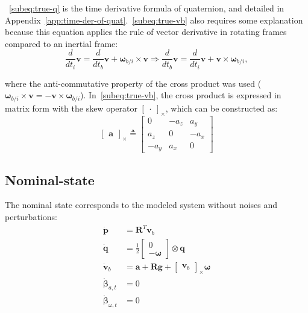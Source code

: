 ~\eqref{subeq:true-q} is the time derivative formula of quaternion, and detailed in Appendix~\ref{app:time-der-of-quat}.~\eqref{subeq:true-vb} also requires some explanation because this equation applies the rule of vector derivative in rotating frames compared to an inertial frame:
\begin{equation}
    \frac{d}{dt_i}\mathbf{v}=\frac{d}{dt_b}\mathbf{v}+\boldsymbol{\omega}_{b/i}\times\mathbf{v}\Rightarrow\frac{d}{dt_b}\mathbf{v}=\frac{d}{dt_i}\mathbf{v}+\mathbf{v}\times\boldsymbol{\omega}_{b/i},
\end{equation}

where the anti-commutative property of the cross product was used ($\boldsymbol{\omega}_{b/i}\times\mathbf{v}=-\mathbf{v}\times\boldsymbol{\omega}_{b/i}$). In~\eqref{subeq:true-vb}, the cross product is expressed in matrix form with the skew operator $\begin{bmatrix}. \end{bmatrix}_{\times}$, which can be constructed as:
\begin{equation}
    \begin{bmatrix}\mathbf{a} \end{bmatrix}_{\times}\triangleq\begin{bmatrix}
        0 & -a_z & a_y \\
        a_z & 0 & -a_x \\
        -a_y & a_x & 0
    \end{bmatrix}
\end{equation}

\subsection*{Nominal-state}

The nominal state corresponds to the modeled system without noises and perturbations:
 \begin{subequations}
    \begin{align}
        \dot{\mathbf{p}} &= \mathbf{R}^T\mathbf{v}_{b} \\
        \dot{\mathbf{q}} &= \frac{1}{2}\begin{bmatrix}0\\ -\boldsymbol{\omega}\end{bmatrix} \otimes \mathbf{q} \\
        \dot{\mathbf{v}}_{b}&=\mathbf{a}+\mathbf{R}\mathbf{g} + \begin{bmatrix}\mathbf{v}_{b} \end{bmatrix}_{\times}\boldsymbol{\omega} \label{subeq:nom-vb}\\
        \dot{\boldsymbol{\beta}}_{a,t}&=0 \label{subeq:nom-ba}\\
        \dot{\boldsymbol{\beta}}_{\omega,t}&=0 \label{subeq:nom-bw}
    \end{align}\label{eq:nominal-state}
\end{subequations}

